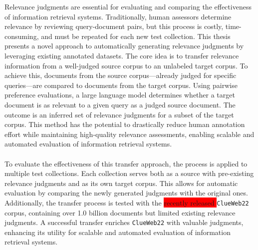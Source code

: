 Relevance judgments are essential for evaluating and comparing the effectiveness of information retrieval systems. Traditionally, human assessors determine relevance by reviewing query-document pairs, but this process is costly, time-consuming, and must be repeated for each new test collection. This thesis presents a novel approach to automatically generating relevance judgments by leveraging existing annotated datasets. The core idea is to transfer relevance information from a well-judged source corpus to an unlabeled target corpus. To achieve this, documents from the source corpus—already judged for specific queries—are compared to documents from the target corpus. Using pairwise preference evaluations, a large language model determines whether a target document is as relevant to a given query as a judged source document. The outcome is an inferred set of relevance judgments for a subset of the target corpus. This method has the potential to drastically reduce human annotation effort while maintaining high-quality relevance assessments, enabling scalable and automated evaluation of information retrieval systems.
\\\\
To evaluate the effectiveness of this transfer approach, the process is applied to multiple test collections. Each collection serves both as a source with pre-existing relevance judgments and as its own target corpus. This allows for automatic evaluation by comparing the newly generated judgments with the original ones. Additionally, the transfer process is tested with the \colorbox{red}{recently released } \texttt{ClueWeb22} corpus, containing over 1.0 billion documents but limited existing relevance judgments. A successful transfer enriches \texttt{ClueWeb22} with valuable judgments, enhancing its utility for scalable and automated evaluation of information retrieval systems.
